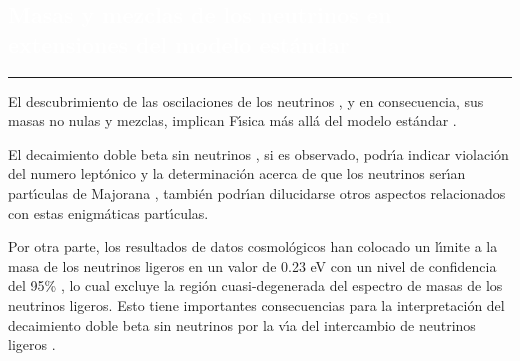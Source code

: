 \begin{titlepage}
\pagecolor{white}
\BgThispage
{}
\vspace*{-1.1cm}
\noindent
\def\titulo#1{\section{#1}}
\section{\bf\large\textcolor{white}{Masas y mezclas de los neutrinos en extensiones  del modelo est\'andar}}

\vspace*{2cm}\par
\noindent

\begin{minipage}{0.5\linewidth}
\begin{minipage}{0.45\linewidth}
    \begin{flushright}
        \printauthor
    \end{flushright}
\end{minipage} \hspace{0pt}
%
\begin{minipage}{0.02\linewidth}
      \color{ptctitle} \rule{1pt}{175pt}
\end{minipage} 
\end{minipage}
\hspace*{-4.5cm}
%
\begin{minipage}{0.85\linewidth}
\begin{minipage}{0.85\linewidth}
\footnotesize
\vspace{5pt}
    \begin{resumen}
El descubrimiento de las oscilaciones de los neutrinos  , y en consecuencia, sus masas no nulas y mezclas,  implican F\'{\i}sica m\'as all\'a del modelo est\'andar \cite{GS} . 
 
El decaimiento doble beta sin neutrinos \cite{RD}, si es observado, podr\'{\i}a indicar violaci\'on del numero lept\'onico y la determinaci\'on acerca de que los neutrinos ser\'{\i}an part\'{\i}culas de Majorana  \cite{SV}, tambi\'en podr\'{\i}an dilucidarse otros aspectos relacionados  con estas enigm\'aticas part\'{\i}culas.

Por otra parte, los resultados de datos cosmol\'ogicos han colocado un l\'{\i}mite a la masa de los neutrinos ligeros  en un valor de 0.23 eV  con un nivel de confidencia del 95\% \cite{AA}, lo cual excluye la regi\'on cuasi-degenerada del espectro de masas de los neutrinos ligeros. Esto tiene importantes consecuencias para la interpretaci\'on del decaimiento doble beta sin neutrinos por la v\'{\i}a del intercambio de neutrinos ligeros \cite{FM}.


\end{resumen}
\end{minipage}
\end{minipage}
\end{titlepage}
